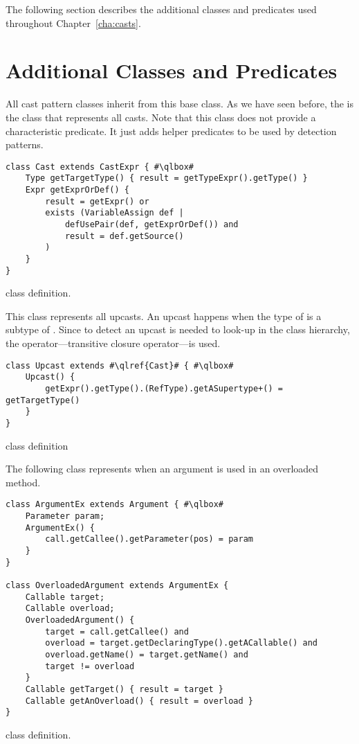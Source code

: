 The following section describes the additional classes and predicates used throughout Chapter~\ref{cha:casts}.

\section{Additional \ql{} Classes and Predicates}\label{ap:ql:classes}

All cast pattern classes inherit from this base class.
As we have seen before,
the  is the \ql{} class that represents all casts.
Note that this class does not provide a characteristic predicate.
It just adds helper predicates to be used by detection patterns.

\begin{listing}
\begin{verbatim}
class Cast extends CastExpr { #\qlbox#
	Type getTargetType() { result = getTypeExpr().getType() }
	Expr getExprOrDef() {
		result = getExpr() or
		exists (VariableAssign def |
			defUsePair(def, getExprOrDef()) and
			result = def.getSource()
		)
	}
}
\end{verbatim}
\caption{ class definition.}
\label{lst:ql:Cast}
\end{listing}

This class represents all upcasts.
An upcast  happens when the type of  is a subtype of .
Since to detect an upcast is needed to look-up in the class hierarchy,
the \code{+} operator---transitive closure operator---is used.

\begin{listing}
\begin{verbatim}
class Upcast extends #\qlref{Cast}# { #\qlbox#
	Upcast() {
		getExpr().getType().(RefType).getASupertype+() = getTargetType()
	}
}
\end{verbatim}
\caption{ class definition}
\label{lst:ql:Upcast}
\end{listing}

The following class represents when an argument is used in an overloaded method.

\begin{listing}
\begin{verbatim}
class ArgumentEx extends Argument { #\qlbox#
	Parameter param;
	ArgumentEx() {
		call.getCallee().getParameter(pos) = param
	}
}

class OverloadedArgument extends ArgumentEx {
	Callable target;
	Callable overload;
	OverloadedArgument() {
		target = call.getCallee() and
		overload = target.getDeclaringType().getACallable() and
		overload.getName() = target.getName() and
		target != overload
	}
	Callable getTarget() { result = target }
	Callable getAnOverload() { result = overload }
}
\end{verbatim}
\caption{ class definition.}
\label{lst:ql:OverloadedArgument}
\end{listing}

